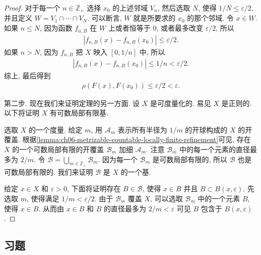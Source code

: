 \documentclass[../../main.tex]{subfiles}
\begin{document}
\begin{proof}
对于每一个 $n\in\mathbb{Z}_+$ 选择 $x_0$ 的上述邻域 $V_n$, 然后选取 $N$, 使得 $1/N\leqslant\varepsilon/2$, 并且定义 $W=V_1\cap\cdots\cap V_N$. 可以断言, $W$ 就是所要求的 $x_0$ 的那个邻域. 令 $x\in W$. 如果 $n\leqslant N$, 因为函数 $f_{n,B}$ 在 $W$ 上或者恒等于 $0$, 或者最多改变 $\varepsilon/2$, 所以
\begin{align*}
|f_{n,B}(x)-f_{n,B}(x_0)|\leqslant\varepsilon/2.
\end{align*}
如果 $n>N$, 因为 $f_{n,B}$ 把 $X$ 映入 $[0,1/n]$ 中, 所以
\begin{align*}
|f_{n,B}(x)-f_{n,B}(x_0)|\leqslant 1/n<\varepsilon/2.
\end{align*}
综上, 最后得到
\begin{align*}
\rho(F(x),F(x_0))\leqslant\varepsilon/2<\varepsilon.
\end{align*}

第二步. 现在我们来证明定理的另一方面. 设 $X$ 是可度量化的. 易见 $X$ 是正则的. 以下将证明 $X$ 有可数局部有限基.

选取 $X$ 的一个度量. 给定 $m$, 用 $\mathcal{A}_m$ 表示所有半径为 $1/m$ 的开球构成的 $X$ 的开覆盖. 根据\cref{lemma:ch06-metrizable-countable-locally-finite-refinement}可见, 存在 $X$ 的一个可数局部有限的开覆盖 $\mathcal{B}_m$ 加细 $\mathcal{A}_m$. 注意 $\mathcal{B}_m$ 中的每一个元素的直径最多为 $2/m$. 令 $\mathcal{B}=\bigcup_{m\in\mathbb{Z}_+}\mathcal{B}_m$. 因为每一个 $\mathcal{B}_m$ 是可数局部有限的, 所以 $\mathcal{B}$ 也是可数局部有限的. 我们来证明 $\mathcal{B}$ 是 $X$ 的一个基.

给定 $x\in X$ 和 $\varepsilon>0$, 下面将证明存在 $B\in\mathcal{B}$, 使得 $x\in B$ 并且 $B\subset B(x,\varepsilon)$. 先选取 $m$, 使得满足 $1/m<\varepsilon/2$. 由于 $\mathcal{B}_m$ 覆盖 $X$, 可以选取 $\mathcal{B}_m$ 中的一个元素 $B$, 使得 $x\in B$. 从而由 $x\in B$ 和 $B$ 的直径最多为 $2/m<\varepsilon$ 可见 $B$ 包含于 $B(x,\varepsilon)$.
\end{proof}

\subsection*{习题}
\end{document}
